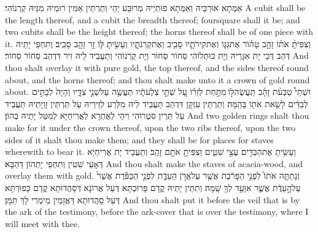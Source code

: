 {אַמְּתָא אוּרְכֵּיהּ וְאַמְּתָא פוּתְיֵיהּ מְרוּבַּע יְהֵי וְתַרְתֵּין אַמִּין רוּמֵיהּ מִנֵּיהּ קַרְנוֹהִי׃}
{A cubit shall be the length thereof, and a cubit the breadth thereof; foursquare shall it be; and two cubits shall be the height thereof; the horns thereof shall be of one piece with it.}{}
{וְצִפִּיתָ֨ אֹת֜וֹ זָהָ֣ב טָה֗וֹר אֶת\maqqaf גַּגּ֧וֹ וְאֶת\maqqaf קִירֹתָ֛יו סָבִ֖יב וְאֶת\maqqaf קַרְנֹתָ֑יו וְעָשִׂ֥יתָ לּ֛וֹ זֵ֥ר זָהָ֖ב סָבִֽיב׃}
{וְתִחְפֵי יָתֵיהּ דְּהַב דְּכֵי יָת אִגָּרֵיהּ וְיָת כּוּתְלוֹהִי סְחוֹר סְחוֹר וְיָת קַרְנוֹהִי וְתַעֲבֵיד לֵיהּ זִיר דִּדְהַב סְחוֹר סְחוֹר׃}
{And thou shalt overlay it with pure gold, the top thereof, and the sides thereof round about, and the horns thereof; and thou shalt make unto it a crown of gold round about.}{}
{וּשְׁתֵּי֩ טַבְּעֹ֨ת זָהָ֜ב תַּֽעֲשֶׂה\maqqaf לּ֣וֹ \legarmeh  מִתַּ֣חַת לְזֵר֗וֹ עַ֚ל שְׁתֵּ֣י צַלְעֹתָ֔יו תַּעֲשֶׂ֖ה עַל\maqqaf שְׁנֵ֣י צִדָּ֑יו וְהָיָה֙ לְבָתִּ֣ים לְבַדִּ֔ים לָשֵׂ֥את אֹת֖וֹ בָּהֵֽמָּה׃}
{וְתַרְתֵּין עִזְקָן דִּדְהַב תַּעֲבֵיד לֵיהּ מִלְּרַע לְזֵירֵיהּ עַל תַּרְתֵּין זָוְיָתֵיהּ תַּעֲבֵיד עַל תְּרֵין סִטְרוֹהִי וִיהֵי לְאַתְרָא לַאֲרִיחַיָּא לְמִטַּל יָתֵיהּ בְּהוֹן׃}
{And two golden rings shalt thou make for it under the crown thereof, upon the two ribs thereof, upon the two sides of it shalt thou make them; and they shall be for places for staves wherewith to bear it.}{}
{וְעָשִׂ֥יתָ אֶת\maqqaf הַבַּדִּ֖ים עֲצֵ֣י שִׁטִּ֑ים וְצִפִּיתָ֥ אֹתָ֖ם זָהָֽב׃}
{וְתַעֲבֵיד יָת אֲרִיחַיָּא דְּאָעֵי שִׁטִּין וְתִחְפֵי יָתְהוֹן דַּהְבָּא׃}
{And thou shalt make the staves of acacia-wood, and overlay them with gold.}{}
{וְנָתַתָּ֤ה אֹתוֹ֙ לִפְנֵ֣י הַפָּרֹ֔כֶת אֲשֶׁ֖ר עַל\maqqaf אֲרֹ֣ן הָעֵדֻ֑ת לִפְנֵ֣י הַכַּפֹּ֗רֶת אֲשֶׁר֙ עַל\maqqaf הָ֣עֵדֻ֔ת אֲשֶׁ֛ר אִוָּעֵ֥ד לְךָ֖ שָֽׁמָּה׃}
{וְתִתֵּין יָתֵיהּ קֳדָם פָּרוּכְתָּא דְּעַל אֲרוֹנָא דְּסָהֲדוּתָא קֳדָם כָּפוּרְתָּא דְּעַל סָהֲדוּתָא דַּאֲזָמֵין מֵימְרִי לָךְ תַּמָּן׃}
{And thou shalt put it before the veil that is by the ark of the testimony, before the ark-cover that is over the testimony, where I will meet with thee.}{}
